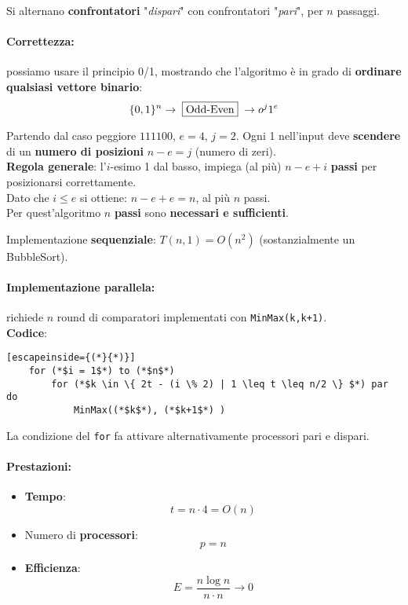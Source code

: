 Si alternano \textbf{confrontatori} "\textit{dispari}" con confrontatori "\textit{pari}", per $n$ passaggi.\\

\paragraph{Correttezza:} possiamo usare il principio 0/1, mostrando che l'algoritmo è in grado di \textbf{ordinare qualsiasi vettore binario}:
$$\{0,1\}^n \rightarrow \; \fbox{Odd-Even} \; \rightarrow o^j 1^e  $$

Partendo dal caso peggiore $111100$, $e=4$, $j=2$. Ogni 1 nell'input deve \textbf{scendere} di un \textbf{numero di posizioni} $n-e=j$ (numero di zeri).\\

\textbf{Regola generale}: l'$i$-esimo 1 dal basso, impiega (al più) $n-e+i$ \textbf{passi} per posizionarsi correttamente.\\
Dato che $i \leq e$ si ottiene: $n-e+e = n$, al più $n$ passi.\\

Per quest'algoritmo $n$ \textbf{passi} sono \textbf{necessari e sufficienti}.

\newpage

Implementazione \textbf{sequenziale}: $T(n,1) = O(n^2)$ (sostanzialmente un BubbleSort).\\

\paragraph{Implementazione parallela:} richiede $n$ round di comparatori implementati con \texttt{MinMax(k,k+1)}. \\

\textbf{Codice}: 
\begin{lstlisting}[escapeinside={(*}{*)}]
	for (*$i = 1$*) to (*$n$*)
		for (*$k \in \{ 2t - (i \% 2) | 1 \leq t \leq n/2 \} $*) par do
			MinMax((*$k$*), (*$k+1$*) )
\end{lstlisting}

La condizione del \texttt{for} fa attivare alternativamente processori pari e dispari.\\

\paragraph{Prestazioni: }
\begin{itemize}
	\item \textbf{Tempo}: 
	$$ t = n \cdot 4 = O(n) $$
	\item Numero di \textbf{processori}: 
	$$ p = n $$
	\item \textbf{Efficienza}: 
	$$ E = \frac{n \log n}{n \cdot n} \rightarrow 0 $$
\end{itemize}

